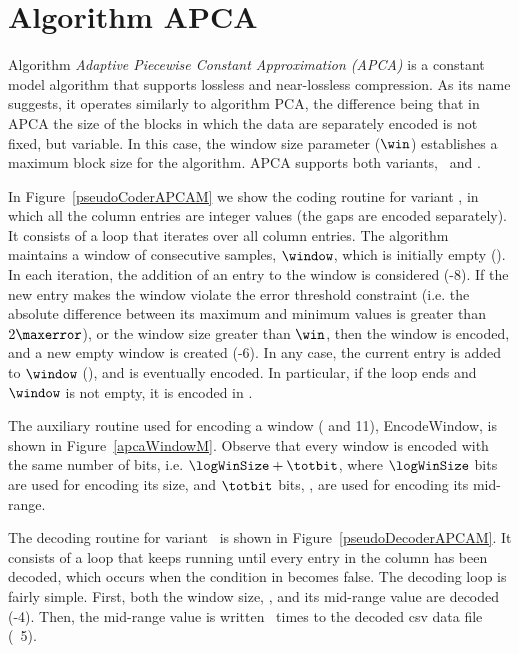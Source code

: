 
\clearpage

\section{Algorithm APCA}
\label{algo:apca}


Algorithm \textit{Adaptive Piecewise Constant Approximation (APCA)} \cite{coder:apca} is a constant model algorithm that supports lossless and near-lossless compression. As its name suggests, it operates similarly to algorithm PCA, the difference being that in APCA the size of the blocks in which the data are separately encoded is not fixed, but variable. In this case, the window size parameter ($\win$) establishes a maximum block size for the algorithm. APCA supports both variants, \maskalgo\ and \NOmaskalgo.


In Figure~\ref{pseudoCoderAPCAM} we show the coding routine for variant \maskalgo, in which all the column entries are integer values (the gaps are encoded separately). It consists of a loop that iterates over all column entries. The algorithm maintains a window of consecutive samples, $\window$, which is initially empty (). In each iteration, the addition of an entry to the window is considered (-8). If the new entry makes the window violate the error threshold constraint (i.e. the absolute difference between its maximum and minimum values is greater than $2\maxerror$), or the window size greater than $\win$, then the window is encoded, and a new empty window is created (-6). In any case, the current entry is added to $\window$ (), and is eventually encoded. In particular, if the loop ends and $\window$ is not empty, it is encoded in . 





\vspace{+2pt}
The auxiliary routine used for encoding a window ( and 11), EncodeWindow, is shown in Figure~\ref{apcaWindowM}. Observe that every window is encoded with the same number of bits, i.e. $\logWinSize +\totbit$, where $\logWinSize$ bits are used for encoding its size, and $\totbit$ bits, \wheretotbit, are used for encoding its mid-range.
\vspace{+3pt}





\clearpage


The decoding routine for variant \maskalgo\ is shown in Figure~\ref{pseudoDecoderAPCAM}. It consists of a loop that keeps running until every entry in the column has been decoded, which occurs when the condition in  becomes false. The decoding loop is fairly simple. First, both the window size, \sizee, and its mid-range value are decoded (-4). Then, the mid-range value is written \sizee\ times to the decoded csv data file (\Line~5).


